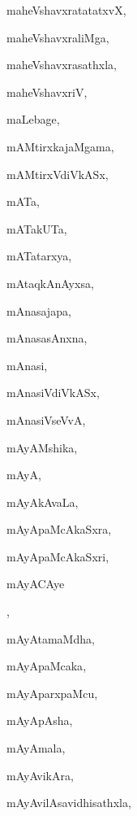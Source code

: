 \begin{multicols}{3}
{\noindent
{maheVshavxratatatxvX}, \pageref{maheVshavxratatatxvX}

\noindent
{maheVshavxraliMga}, \pageref{maheVshavxraliMga}

\noindent
{maheVshavxrasathxla}, \pageref{maheVshavxrasathxla}

\noindent
{maheVshavxriV}, \pageref{maheVshavxriV}

\noindent
{maLebage}, \pageref{maLebage}

\noindent
{mAMtirxkajaMgama}, \pageref{mAMtirxkajaMgama}

\noindent
{mAMtirxVdiVkASx}, \pageref{mAMtirxVdiVkASx}

\noindent
{mATa}, \pageref{mATa}

\noindent
{mATakUTa}, \pageref{mATakUTa}

\noindent
{mATatarxya}, \pageref{mATatarxya}

\noindent
{mAtaqkAnAyxsa}, \pageref{mAtaqkAnAyxsa}

\noindent
{mAnasajapa}, \pageref{mAnasajapa}

\noindent
{mAnasasAnxna}, \pageref{mAnasasAnxna}

\noindent
{mAnasi}, \pageref{mAnasi}

\noindent
{mAnasiVdiVkASx}, \pageref{mAnasiVdiVkASx}

\noindent
{mAnasiVseVvA}, \pageref{mAnasiVseVvA}

\noindent
{mAyAMshika}, \pageref{mAyAMshika}

\noindent
{mAyA}, \pageref{mAyA}

\noindent
{mAyAkAvaLa}, \pageref{mAyAkAvaLa}

\noindent
{mAyApaMcAkaSxra}, \pageref{mAyApaMcAkaSxra}

\noindent
{mAyApaMcAkaSxri}, \pageref{mAyApaMcAkaSxri}

\noindent
{mAyACAye}

\noindent
{}, \pageref{mAyACAyeCAyAmAye}

\noindent
{mAyAtamaMdha}, \pageref{mAyAtamaMdha}

\noindent
{mAyApaMcaka}, \pageref{mAyApaMcaka}

\noindent
{mAyAparxpaMcu}, \pageref{mAyAparxpaMcu}

\noindent
{mAyApAsha}, \pageref{mAyApAsha}

\noindent
{mAyAmala}, \pageref{mAyAmala}

\noindent
{mAyAvikAra}, \pageref{mAyAvikAra}

\noindent
{mAyAvilAsavidhisathxla}, \pageref{mAyAvilAsavidhisathxla}

}
\end{multicols}
